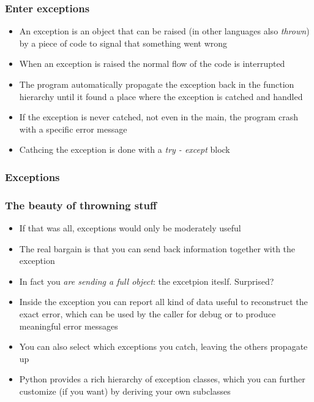 \documentclass[9pt]{beamer}
\begin{document}
\begin{frame}
  \frametitle{Enter exceptions}

  \begin{itemize}
    \item An exception is an object that can be \alert{raised} (in other languages also \textit{thrown}) by
          a piece of code to signal that something went wrong
    \item When an exception is raised the normal flow of the code is interrupted
    \item The program automatically propagate the exception back in the function hierarchy
          until it found a place where the exception is  \alert{catched} and handled
    \item If the exception is never catched, not even in the main, the program crash \alert{with a specific error message}
    \item Cathcing the exception is done with a \emph{try - except} block
  \end{itemize}
\end{frame}


\begin{frame}
  \frametitle{Exceptions}
  
\end{frame}


\begin{frame}
  \frametitle{The beauty of throwning stuff}

  \begin{itemize}
    \item If that was all, exceptions would only be moderately useful
    \item The real bargain is that you can send back information together with the exception
    \item In fact you \textit{are sending a full object}: the excetpion iteslf. Surprised?
    \item Inside the exception you can report all kind of data useful to reconstruct the exact error,
          which can be used by the caller for debug or to produce meaningful error messages
    \item You can also select which exceptions you catch, leaving the others propagate up
    \item Python provides a rich hierarchy of exception classes, which you can further customize
          (if you want) by deriving your own subclasses
  \end{itemize}
\end{frame}
\end{document}
